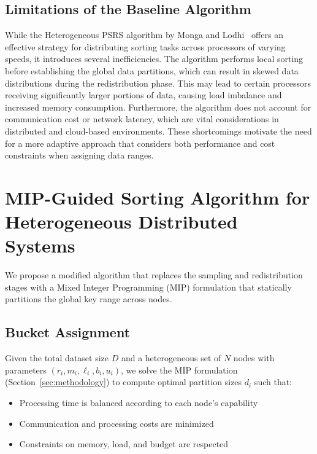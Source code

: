 \documentclass[]{interact}
\theoremstyle{plain}
\theoremstyle{definition}
\theoremstyle{remark}
\begin{document}
\subsection{Limitations of the Baseline Algorithm}

While the Heterogeneous PSRS algorithm by Monga and Lodhi~\cite{monga2020heterogeneous} offers an effective strategy for distributing sorting tasks across processors of varying speeds, it introduces several inefficiencies. The algorithm performs local sorting before establishing the global data partitions, which can result in skewed data distributions during the redistribution phase. This may lead to certain processors receiving significantly larger portions of data, causing load imbalance and increased memory consumption. Furthermore, the algorithm does not account for communication cost or network latency, which are vital considerations in distributed and cloud-based environments. These shortcomings motivate the need for a more adaptive approach that considers both performance and cost constraints when assigning data ranges.






\section{MIP-Guided Sorting Algorithm for Heterogeneous Distributed Systems}

We propose a modified algorithm that replaces the sampling and redistribution stages with a Mixed Integer Programming (MIP) formulation that statically partitions the global key range across nodes.

\subsection{Bucket Assignment}

Given the total dataset size $D$ and a heterogeneous set of $N$ nodes with parameters $(r_i, m_i, \ell_i, b_i, u_i)$, we solve the MIP formulation (Section~\ref{sec:methodology}) to compute optimal partition sizes $d_i$ such that:

\begin{itemize}
    \item Processing time is balanced according to each node's capability
    \item Communication and processing costs are minimized
    \item Constraints on memory, load, and budget are respected
\end{itemize}
\end{document}
